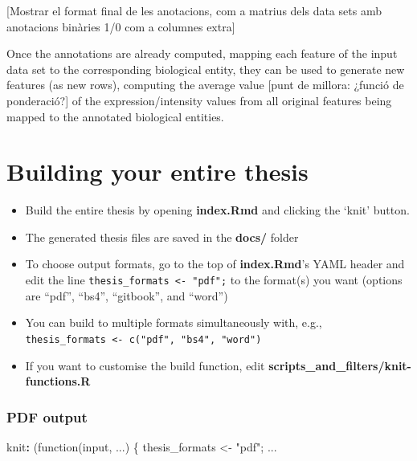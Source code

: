 \documentclass[a4paper, nobind]{templates/ociamthesis}
\providecommand{\tightlist}{%
  \setlength{\itemsep}{0pt}\setlength{\parskip}{0pt}}
\newenvironment{Shaded}{\begin{snugshade}}{\end{snugshade}}
\newcommand{\AttributeTok}[1]{\textcolor[rgb]{0.77,0.63,0.00}{#1}}
\newcommand{\FunctionTok}[1]{\textcolor[rgb]{0.00,0.00,0.00}{#1}}
\newcommand{\KeywordTok}[1]{\textcolor[rgb]{0.13,0.29,0.53}{\textbf{#1}}}
\renewenvironment{Shaded}
{
  \vspace{10pt}%
  \begin{snugshade}%
}{%
  \end{snugshade}%
  \vspace{8pt}%
}
\begin{document}
{[}Mostrar el format final de les anotacions, com a matrius dels data sets amb anotacions binàries 1/0 com a columnes extra{]}

Once the annotations are already computed, mapping each feature of the input data set to the corresponding biological entity, they can be used to generate new features (as new rows), computing the average value {[}punt de millora: ¿funció de ponderació?{]} of the expression/intensity values from all original features being mapped to the annotated biological entities.

\hypertarget{building-your-entire-thesis}{%
\section{Building your entire thesis}\label{building-your-entire-thesis}}

\begin{itemize}
\tightlist
\item
  Build the entire thesis by opening \textbf{index.Rmd} and clicking the `knit' button.
\item
  The generated thesis files are saved in the \textbf{docs/} folder
\item
  To choose output formats, go to the top of \textbf{index.Rmd}'s YAML header and edit the line \texttt{thesis\_formats\ \textless{}-\ "pdf";} to the format(s) you want (options are ``pdf'', ``bs4'', ``gitbook'', and ``word'')
\item
  You can build to multiple formats simultaneously with, e.g., \texttt{thesis\_formats\ \textless{}-\ c("pdf",\ "bs4",\ "word")}
\item
  If you want to customise the build function, edit \textbf{scripts\_and\_filters/knit-functions.R}
\end{itemize}

\hypertarget{pdf-output}{%
\subsubsection{PDF output}\label{pdf-output}}

\begin{Shaded}
\begin{Highlighting}[]
\FunctionTok{knit}\KeywordTok{:}\AttributeTok{ (function(input, ...) \{}
\AttributeTok{    thesis\_formats \textless{}{-} "pdf";}
\AttributeTok{    ...}
\end{Highlighting}
\end{Shaded}
\end{document}
